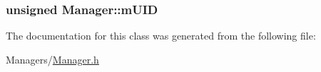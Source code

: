 \subsubsection[{\texorpdfstring{m\+U\+ID}{mUID}}]{\setlength{\rightskip}{0pt plus 5cm}unsigned Manager\+::m\+U\+ID\hspace{0.3cm}{\ttfamily [private]}}\hypertarget{classManager_ab1385f905d790384d4b9282c82153548}{}\label{classManager_ab1385f905d790384d4b9282c82153548}


The documentation for this class was generated from the following file\+:\begin{DoxyCompactItemize}
\item 
Managers/\hyperlink{Manager_8h}{Manager.\+h}\end{DoxyCompactItemize}
